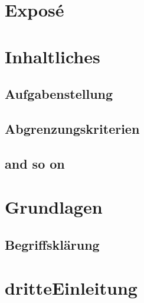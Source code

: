 \documentclass[13pt,a4paper,oneside]{scrbook} %
\begin{document}
\pagestyle{fancy}

\maketitle
\clearpage






\tableofcontents


\chapter{Exposé}

\chapter{Inhaltliches}
	\section{Aufgabenstellung}
	\section{Abgrenzungskriterien}
	\section{and so on}
\chapter{Grundlagen}
	\section{Begriffsklärung}


\chapter{dritteEinleitung}


\end{document}
